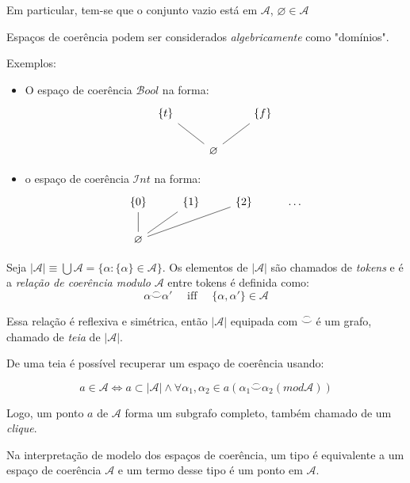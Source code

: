 \documentclass[../main.tex]{subfiles}
\begin{document}
Em particular, tem-se que o conjunto vazio está em $\mathcal{A}$, $\varnothing  \in \mathcal{A}$

Espaços de coerência podem ser considerados \emph{algebricamente} como "domínios".

Exemplos:

\begin{itemize}
    \item O espaço de coerência $\mathcal{B}ool$ na forma:
    \[\begin{tikzcd}
	{\{t\}} && {\{f\}} \\
	& \varnothing
	\arrow[no head, from=1-1, to=2-2]
	\arrow[no head, from=1-3, to=2-2]
\end{tikzcd}\]
    \item o espaço de coerência $\mathcal{I}nt$ na forma:
\[\begin{tikzcd}
	{\{0\}} & {\{1\}} & {\{2\}} & \dots \\
	\varnothing
	\arrow[no head, from=1-1, to=2-1]
	\arrow[no head, from=1-2, to=2-1]
	\arrow[no head, from=1-3, to=2-1]
\end{tikzcd}\]
\end{itemize}

\begin{definition}
    Seja $|\mathcal{A}| \equiv \bigcup \mathcal{A} = \{\alpha : \{\alpha\} \in \mathcal{A}\}$. Os elementos de $|\mathcal{A}|$ são chamados de \emph{tokens} e é a \emph{relação de coerência modulo } $\mathcal{A}$ entre tokens é definida como:
    $$\alpha \stackrel{\frown}{\smile} \alpha' \quad \text{ iff } \quad \{\alpha, \alpha'\} \in \mathcal{A} $$
\end{definition}

Essa relação é reflexiva e simétrica, então $| \mathcal{A} |$ equipada com $\stackrel{\frown}{\smile}$ é um grafo, chamado de \emph{teia} de $|\mathcal{A}|$.

De uma teia é possível recuperar um espaço de coerência usando:

$$a \in \mathcal{A} \Leftrightarrow a \subset |\mathcal{A}| \land \forall \alpha_1, \alpha_2 \in a (\alpha_1 \stackrel{\frown}{\smile} \alpha_2 (mod \mathcal{A}))$$

Logo, um ponto $a$ de $\mathcal{A}$ forma um subgrafo completo, também chamado de um \emph{clique}.

Na interpretação de modelo dos espaços de coerência, um tipo é equivalente a um espaço de coerência $\mathcal{A}$ e um termo desse tipo é um ponto em $\mathcal{A}$.
\end{document}
